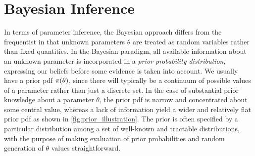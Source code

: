 \section{Bayesian Inference}\label{sec:bayes_paradigm}

In terms of parameter inference, the Bayesian approach differs from the frequentist in that unknown parameters $\theta$ are treated as random variables rather than fixed quantities. In the Bayesian paradigm, all available information about an unknown parameter is incorporated in a \textit{prior probability distribution}, expressing our beliefs before some evidence is taken into account. We usually have a prior pdf $\pi \qty(\theta)$, since there will typically be a continuum of possible values of a parameter rather than just a discrete set. In the case of substantial prior knowledge about a parameter $\theta$, the prior pdf is narrow and concentrated about some central value, whereas a lack of information yield a wider and relatively flat prior pdf as shown in \autoref{fig:prior_illustration}. The prior is often specified by a particular distribution among a set of well-known and tractable distributions, with the purpose of making evaluation of prior probabilities and random generation of $\theta$ values straightforward.




